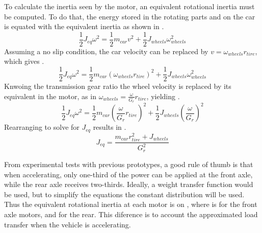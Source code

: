 To calculate the inertia seen by the motor, an equivalent rotational inertia must be computed. To do that, the energy stored in the rotating parts and on the car is equated with the equivalent inertia as shown in .
\begin{equation}
	\frac{1}{2}J_{eq}\omega^2 = \frac{1}{2}m_{car}v^2 + \frac{1}{2}J_{wheels}\omega^2_{wheels}
	\label{eq:iner_equivalent0}
\end{equation}
Assuming a no slip condition, the car velocity can be replaced by $v = \omega_{wheels}r_{tire}$, which gives .
\begin{equation}
	\frac{1}{2}J_{eq}\omega^2 = \frac{1}{2}m_{car}(\omega_{wheels}r_{tire})^2 + \frac{1}{2}J_{wheels}\omega_{wheels}^2
	\label{eq:iner_equivalent1}
\end{equation}
Knwoing the transmission gear ratio the wheel velocity is replaced by its equivalent in the motor, as in $\omega_{wheels} = \frac{\omega}{G_r}r_{tire}$, yielding .
\begin{equation}
	\frac{1}{2}J_{eq}\omega^2 = \frac{1}{2}m_{car}\left(\frac{\omega}{G_r}r_{tire}\right)^2 + \frac{1}{2}J_{wheels}\left(\frac{\omega}{G_r}\right)^2
	\label{eq:iner_equivalent2}
\end{equation}
Rearranging to solve for $J_{eq}$ results in .
\begin{equation}
	J_{eq} = \frac{m_{car}r_{tire}^2 + J_{wheels}}{G_r^2}
	\label{eq:iner_equivalent}
\end{equation}

From experimental tests with previous prototypes, a good rule of thumb is that when accelerating, only one-third of the power can be applied at the front axle, while the rear axle receives two-thirds. Ideally, a weight transfer function would be used, but to simplify the equations the constant distribution will be used. Thus the equivalent rotational inertia at each motor is on , where  is for the front axle motors, and  for the rear. This diference is to account the approximated load transfer when the vehicle is accelerating.

